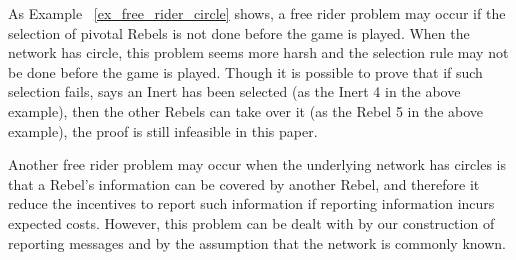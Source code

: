 \documentclass[12pt,letter]{article}
\theoremstyle{definition}
\theoremstyle{remark}
\theoremstyle{claim}
\begin{document}
As Example ~\ref{ex_free_rider_circle} shows, a free rider problem may occur if the selection of pivotal Rebels is not done before the game is played. When the network has circle, this problem seems more harsh and the selection rule may not be done before the game is played. Though it is possible to prove that if such selection  fails, says an Inert has been selected (as the Inert 4 in the above example), then the other Rebels can take over it (as the Rebel 5 in the above example), the proof is still infeasible in this paper. 

Another free rider problem may occur when the underlying network has circles is that a Rebel's information can be covered by another Rebel, and therefore it reduce the incentives to report such information if reporting information incurs expected costs. However, this problem can be dealt with by our construction of reporting messages and by the assumption that the network is commonly known. 
\end{document}
